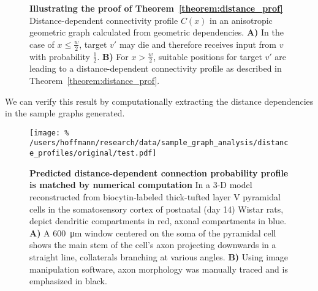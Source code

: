 \begin{figure}[h] 
  \centering 
  \caption{\textbf{Illustrating the proof of
      Theorem~\ref{theorem:distance_prof}} Distance-dependent
    connectivity profile $C(x)$ in an anisotropic geometric graph
    calculated from geometric dependencies. \textbf{A)} In the case of
    $x\leq \frac{w}{2}$, target $v'$ may die and therefore receives input
    from $v$ with probability $\frac{1}{2}$. \textbf{B)} For $x >
    \frac{w}{2}$, suitable positions for target $v'$ are leading to a
    distance-dependent connectivity profile as described in
    Theorem~\ref{theorem:distance_prof}.}
  \label{fig:geomtr_prb}
\end{figure}


We can verify this result by computationally extracting the distance
dependencies in the sample graphs generated. 

\begin{figure}[!htbp]
  \centering
  \texttt{[image: \%
    /users/hoffmann/research/data/sample\_graph\_analysis/distance\_profiles/original/test.pdf]} %
  \caption{\textbf{Predicted distance-dependent connection probability
    profile is matched by numerical computation} In a
    3-D model reconstructed from biocytin-labeled thick-tufted layer V
    pyramidal cells in the somatosensory cortex of postnatal (day 14)
    Wistar rats, \textcite{Romand2011} depict dendritic compartments in
    red, axonal compartments in blue.  \textbf{A)} A
    \SI{600}{\micro\meter} window centered on the soma of the pyramidal
    cell shows the main stem of the cell's axon projecting downwards in a
    straight line, collaterals branching at various angles. \textbf{B)}
    Using image manipulation software, axon morphology was manually traced
    and is emphasized in black.} %
  \label{fig:distance_theory_compare}%
\end{figure}






